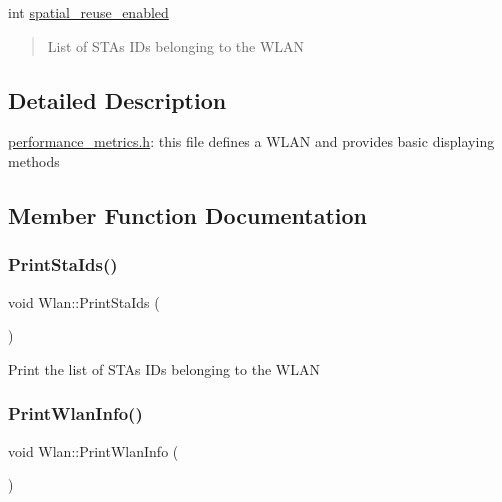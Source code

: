\begin{DoxyCompactItemize}
\begin{DoxyCompactList}
\end{DoxyCompactList}\item 
\mbox{\label{structWlan_a8a4341ee1859a7fe80a22e5ed9b4d89e}} 
int \hyperlink{structWlan_a8a4341ee1859a7fe80a22e5ed9b4d89e}{spatial\+\_\+reuse\+\_\+enabled}
\begin{DoxyCompactList}\small\item\em \begin{quote}
List of S\+T\+As I\+Ds belonging to the W\+L\+AN \end{quote}
\end{DoxyCompactList}\end{DoxyCompactItemize}


\subsection{Detailed Description}
\hyperlink{performance__metrics_8h_source}{performance\+\_\+metrics.\+h}\+: this file defines a W\+L\+AN and provides basic displaying methods 

\subsection{Member Function Documentation}
\mbox{\label{structWlan_af4e4a70fe79d50c26429879d57fa1b95}} 
\subsubsection{\texorpdfstring{Print\+Sta\+Ids()}{PrintStaIds()}}
{\footnotesize\ttfamily void Wlan\+::\+Print\+Sta\+Ids (\begin{DoxyParamCaption}{ }\end{DoxyParamCaption})\hspace{0.3cm}{\ttfamily [inline]}}

Print the list of S\+T\+As I\+Ds belonging to the W\+L\+AN \mbox{\label{structWlan_a93adab5b705fd56386e625e6cad0ccfd}} 
\subsubsection{\texorpdfstring{Print\+Wlan\+Info()}{PrintWlanInfo()}}
{\footnotesize\ttfamily void Wlan\+::\+Print\+Wlan\+Info (\begin{DoxyParamCaption}{ }\end{DoxyParamCaption})\hspace{0.3cm}{\ttfamily [inline]}}

